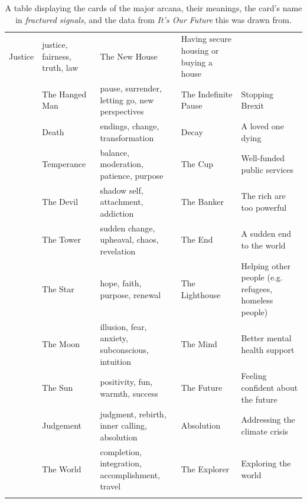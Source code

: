 \begin{table}[]
{\begin{tabular}{|>{\raggedright}p{1.5in}|>{\raggedright}p{2in}|>{\raggedright}p{1.5in}|>{\raggedright}p{2in}|}
Justice          & justice, fairness, truth, law                           & The New House        & Having secure housing or buying a house               \\ & \hline
The Hanged Man   & pause, surrender, letting go, new perspectives          & The Indefinite Pause & Stopping Brexit                                       \\ & \hline
Death            & endings, change, transformation                         & Decay                & A loved one dying                                     \\ & \hline
Temperance       & balance, moderation, patience, purpose                  & The Cup              & Well-funded public services                           \\ & \hline
The Devil        & shadow self, attachment, addiction                      & The Banker           & The rich are too powerful                             \\ & \hline
The Tower        & sudden change, upheaval, chaos, revelation              & The End              & A sudden end to the world                             \\ & \hline
The Star         & hope, faith, purpose, renewal                           & The Lighthouse       & Helping other people (e.g. refugees, homeless people) \\ & \hline
The Moon         & illusion, fear, anxiety, subconscious, intuition        & The Mind             & Better mental health support                          \\ & \hline
The Sun          & positivity, fun, warmth, success                        & The Future           & Feeling confident about the future                    \\ & \hline
Judgement        & judgment, rebirth, inner calling, absolution            & Absolution           & Addressing the climate crisis                         \\ & \hline
The World        & completion, integration, accomplishment, travel         & The Explorer         & Exploring the world  \\ & \hline                                  
\end{tabular}%
}
%
\caption{A table displaying the cards of the major arcana, their meanings, the card's name in \textit{fractured signals}, and the data from \textit{It's Our Future} this was drawn from.}
\label{tab:tarot-meaning}
\end{table}

